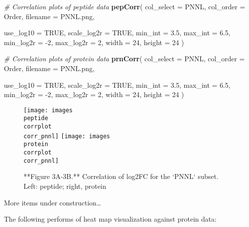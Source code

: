 \documentclass[]{article}
\newenvironment{Shaded}{\begin{snugshade}}{\end{snugshade}}
\newcommand{\CommentTok}[1]{\textcolor[rgb]{0.56,0.35,0.01}{\textit{#1}}}
\newcommand{\DataTypeTok}[1]{\textcolor[rgb]{0.13,0.29,0.53}{#1}}
\newcommand{\DecValTok}[1]{\textcolor[rgb]{0.00,0.00,0.81}{#1}}
\newcommand{\FloatTok}[1]{\textcolor[rgb]{0.00,0.00,0.81}{#1}}
\newcommand{\KeywordTok}[1]{\textcolor[rgb]{0.13,0.29,0.53}{\textbf{#1}}}
\newcommand{\NormalTok}[1]{#1}
\newcommand{\OtherTok}[1]{\textcolor[rgb]{0.56,0.35,0.01}{#1}}
\begin{document}
\begin{Shaded}
\begin{Highlighting}[]
\CommentTok{# Correlation plots of peptide data}
\KeywordTok{pepCorr}\NormalTok{(}
    \DataTypeTok{col_select =}\NormalTok{ PNNL,}
    \DataTypeTok{col_order =}\NormalTok{ Order,}
    \DataTypeTok{filename =}\NormalTok{ PNNL.png,}
    
    \DataTypeTok{use_log10 =} \OtherTok{TRUE}\NormalTok{, }
    \DataTypeTok{scale_log2r =} \OtherTok{TRUE}\NormalTok{, }
    \DataTypeTok{min_int =} \FloatTok{3.5}\NormalTok{,}
    \DataTypeTok{max_int =} \FloatTok{6.5}\NormalTok{, }
    \DataTypeTok{min_log2r =} \DecValTok{-2}\NormalTok{, }
    \DataTypeTok{max_log2r =} \DecValTok{2}\NormalTok{, }
    \DataTypeTok{width =} \DecValTok{24}\NormalTok{,}
    \DataTypeTok{height =} \DecValTok{24}
\NormalTok{)}

\CommentTok{# Correlation plots of protein data}
\KeywordTok{prnCorr}\NormalTok{(}
    \DataTypeTok{col_select =}\NormalTok{ PNNL,}
    \DataTypeTok{col_order =}\NormalTok{ Order,}
    \DataTypeTok{filename =}\NormalTok{ PNNL.png,}
    
    \DataTypeTok{use_log10 =} \OtherTok{TRUE}\NormalTok{, }
    \DataTypeTok{scale_log2r =} \OtherTok{TRUE}\NormalTok{, }
    \DataTypeTok{min_int =} \FloatTok{3.5}\NormalTok{,}
    \DataTypeTok{max_int =} \FloatTok{6.5}\NormalTok{, }
    \DataTypeTok{min_log2r =} \DecValTok{-2}\NormalTok{, }
    \DataTypeTok{max_log2r =} \DecValTok{2}\NormalTok{,}
    \DataTypeTok{width =} \DecValTok{24}\NormalTok{,}
    \DataTypeTok{height =} \DecValTok{24}     
\NormalTok{)}
\end{Highlighting}
\end{Shaded}

\begin{figure}

{\centering \texttt{[image: images\\peptide\\corrplot\\corr\_pnnl]} \texttt{[image: images\\protein\\corrplot\\corr\_pnnl]} 

}

\caption{**Figure 3A-3B.** Correlation of log2FC for the `PNNL` subset. Left: peptide; right, protein}\label{fig:Correlation plots}
\end{figure}

More items under construction\ldots{}

The following performs of heat map visualization against protein data:
\end{document}
